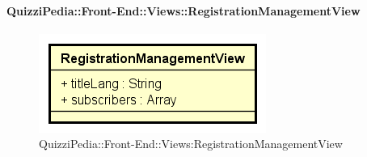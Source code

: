 \paragraph{QuizziPedia::Front-End::Views::RegistrationManagementView}
\begin{figure} [ht]
	\centering
	\includegraphics[scale=0.45]{UML/Classi/Front-End/QuizziPedia_Front-end_RegistrationManagementView.png}
	\caption{QuizziPedia::Front-End::Views:RegistrationManagementView}
\end{figure} \FloatBarrier
